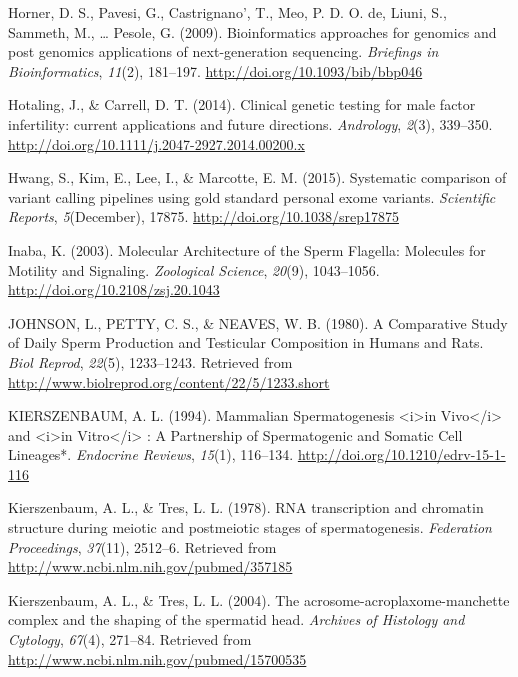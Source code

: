 \documentclass[12pt,twoside]{reedthesis}
\theoremstyle{definition}
\theoremstyle{definition}
\theoremstyle{remark}
\begin{document}
  \hypertarget{ref-Horner2009}{}
  Horner, D. S., Pavesi, G., Castrignano', T., Meo, P. D. O. de, Liuni,
  S., Sammeth, M., \ldots{} Pesole, G. (2009). Bioinformatics approaches
  for genomics and post genomics applications of next-generation
  sequencing. \emph{Briefings in Bioinformatics}, \emph{11}(2), 181--197.
  \url{http://doi.org/10.1093/bib/bbp046}
  
  \hypertarget{ref-Hotaling2014}{}
  Hotaling, J., \& Carrell, D. T. (2014). Clinical genetic testing for
  male factor infertility: current applications and future directions.
  \emph{Andrology}, \emph{2}(3), 339--350.
  \url{http://doi.org/10.1111/j.2047-2927.2014.00200.x}
  
  \hypertarget{ref-Hwang2015}{}
  Hwang, S., Kim, E., Lee, I., \& Marcotte, E. M. (2015). Systematic
  comparison of variant calling pipelines using gold standard personal
  exome variants. \emph{Scientific Reports}, \emph{5}(December), 17875.
  \url{http://doi.org/10.1038/srep17875}
  
  \hypertarget{ref-Inaba2003}{}
  Inaba, K. (2003). Molecular Architecture of the Sperm Flagella:
  Molecules for Motility and Signaling. \emph{Zoological Science},
  \emph{20}(9), 1043--1056. \url{http://doi.org/10.2108/zsj.20.1043}
  
  \hypertarget{ref-Johnson1980}{}
  JOHNSON, L., PETTY, C. S., \& NEAVES, W. B. (1980). A Comparative Study
  of Daily Sperm Production and Testicular Composition in Humans and Rats.
  \emph{Biol Reprod}, \emph{22}(5), 1233--1243. Retrieved from
  \url{http://www.biolreprod.org/content/22/5/1233.short}
  
  \hypertarget{ref-KIERSZENBAUM1994}{}
  KIERSZENBAUM, A. L. (1994). Mammalian Spermatogenesis
  \textless{}i\textgreater{}in Vivo\textless{}/i\textgreater{} and
  \textless{}i\textgreater{}in Vitro\textless{}/i\textgreater{} : A
  Partnership of Spermatogenic and Somatic Cell Lineages*. \emph{Endocrine
  Reviews}, \emph{15}(1), 116--134.
  \url{http://doi.org/10.1210/edrv-15-1-116}
  
  \hypertarget{ref-Kierszenbaum1978}{}
  Kierszenbaum, A. L., \& Tres, L. L. (1978). RNA transcription and
  chromatin structure during meiotic and postmeiotic stages of
  spermatogenesis. \emph{Federation Proceedings}, \emph{37}(11), 2512--6.
  Retrieved from \url{http://www.ncbi.nlm.nih.gov/pubmed/357185}
  
  \hypertarget{ref-Kierszenbaum2004}{}
  Kierszenbaum, A. L., \& Tres, L. L. (2004). The
  acrosome-acroplaxome-manchette complex and the shaping of the spermatid
  head. \emph{Archives of Histology and Cytology}, \emph{67}(4), 271--84.
  Retrieved from \url{http://www.ncbi.nlm.nih.gov/pubmed/15700535}
  
\end{document}
